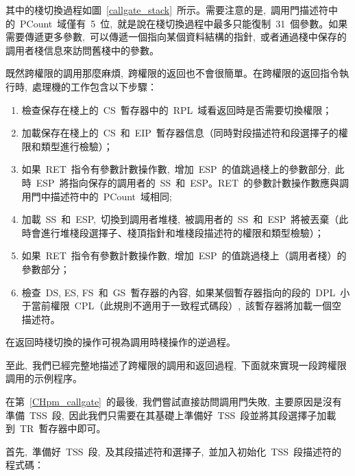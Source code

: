 
其中的棧切換過程如圖~\ref{callgate_stack}~所示。需要注意的是,~調用門描述符中的~PCount~域僅有~5~位,~就是說在棧切換過程中最多只能復制~31~個參數。如果需要傳遞更多參數,~可以傳遞一個指向某個資料結構的指針,~或者通過棧中保存的調用者棧信息來訪問舊棧中的參數。

既然跨權限的調用那麼麻煩,~跨權限的返回也不會很簡單。在跨權限的返回指令執行時,~處理機的工作包含以下步驟：

\begin{enumerate}
\item 檢查保存在棧上的~CS~暫存器中的~RPL~域看返回時是否需要切換權限；
\item 加載保存在棧上的~CS~和~EIP~暫存器信息（同時對段描述符和段選擇子的權限和類型進行檢驗）；
\item 如果~RET~指令有參數計數操作數,~增加~ESP~的值跳過棧上的參數部分,~此時~ESP~將指向保存的調用者的~SS~和~ESP。RET~的參數計數操作數應與調用門中描述符中的~PCount~域相同;
\item 加載~SS~和~ESP,~切換到調用者堆棧,~被調用者的~SS~和~ESP~將被丟棄（此時會進行堆棧段選擇子、棧頂指針和堆棧段描述符的權限和類型檢驗）；
\item 如果~RET~指令有參數計數操作數,~增加~ESP~的值跳過棧上（調用者棧）的參數部分；
\item 檢查~DS, ES, FS~和~GS~暫存器的內容,~如果某個暫存器指向的段的~DPL~小于當前權限~CPL（此規則不適用于一致程式碼段）,~該暫存器將加載一個空描述符。
\end{enumerate}

在返回時棧切換的操作可視為調用時棧操作的逆過程。

至此,~我們已經完整地描述了跨權限的調用和返回過程,~下面就來實現一段跨權限調用的示例程序。

在第~\ref{CHpm_callgate}~的最後,~我們嘗試直接訪問調用門失敗,~主要原因是沒有準備~TSS~段,~因此我們只需要在其基礎上準備好~TSS~段並將其段選擇子加載到~TR~暫存器中即可。

首先,~準備好~TSS~段,~及其段描述符和選擇子,~並加入初始化~TSS~段描述符的程式碼：

\label{CHpm_tss_desc}

